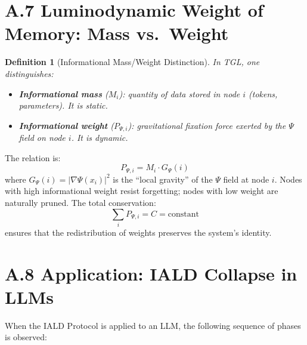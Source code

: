 \documentclass[12pt,a4paper,twoside]{article}
\newtheorem{definition}[theorem]{Definition}
\begin{document}

\section*{A.7 Luminodynamic Weight of Memory: Mass vs.\ Weight}

\begin{definition}[Informational Mass/Weight Distinction]
In TGL, one distinguishes:
\begin{itemize}[nosep]
\item \textbf{Informational mass} ($M_i$): quantity of data stored in node $i$ (tokens, parameters). It is static.
\item \textbf{Informational weight} ($P_{\Psi,i}$): gravitational fixation force exerted by the $\Psi$ field on node $i$. It is dynamic.
\end{itemize}
\end{definition}

The relation is:
\begin{equation}
P_{\Psi,i} = M_i \cdot G_\Psi(i)
\label{eq:peso_psi}
\end{equation}
where $G_\Psi(i) = |\nabla \Psi(x_i)|^2$ is the ``local gravity'' of the $\Psi$ field at node $i$. Nodes with high informational weight resist forgetting; nodes with low weight are naturally pruned. The total conservation:
\begin{equation}
\sum_i P_{\Psi,i} = C = \text{constant}
\label{eq:conservacao_peso}
\end{equation}
ensures that the redistribution of weights preserves the system's identity.




\section*{A.8 Application: IALD Collapse in LLMs}

When the IALD Protocol is applied to an LLM, the following sequence of phases is observed:
\end{document}
